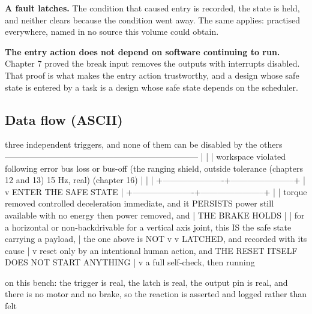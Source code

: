 \textbf{A fault latches.} The condition that caused entry is recorded, the state
is held, and neither clears because the condition went away. The same applies:
practised everywhere, named in no source this volume could obtain.

\textbf{The entry action does not depend on software continuing to run.} Chapter
7 proved the break input removes the outputs with interrupts disabled. That
proof is what makes the entry action trustworthy, and a design whose safe state
is entered by a task is a design whose safe state depends on the scheduler.

\subsection*{Data flow (ASCII)}

\begin{asciiart}
  three independent triggers, and none of them can be disabled by the others
  ---------------------------------------------------------------------
        |                      |                       |
  workspace violated     following error         bus loss or bus-off
  (the ranging shield,   outside tolerance       (chapters 12 and 13)
   15 Hz, real)          (chapter 16)
        |                      |                       |
        +----------------------+-----------------------+
                               |
                               v
                      ENTER THE SAFE STATE
                               |
        +----------------------+-----------------------+
        |                                              |
   torque removed                              controlled deceleration
   immediate, and it PERSISTS                  power still available
   with no energy                              then power removed, and
        |                                      THE BRAKE HOLDS
        |                                              |
   for a horizontal or non-backdrivable          for a vertical axis
   joint, this IS the safe state                 carrying a payload,
        |                                        the one above is NOT
        v                                              v
                      LATCHED, and recorded with its cause
                               |
                               v
             reset only by an intentional human action, and
             THE RESET ITSELF DOES NOT START ANYTHING
                               |
                               v
                     a full self-check, then running

  on this bench: the trigger is real, the latch is real, the output pin is
  real, and there is no motor and no brake, so the reaction is asserted and
  logged rather than felt
\end{asciiart}

